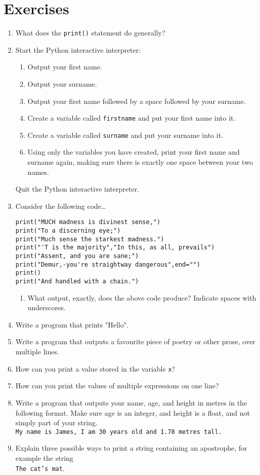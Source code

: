 \section{Exercises}
\begin{enumerate}
	\item What does the \texttt{print()} statement do generally?
	\item Start the Python interactive interpreter:     
\begin{enumerate}
	\item Output your first name.
	\item Output your surname.
	\item Output your first name followed by a space followed by         your surname.
	\item Create a variable called \texttt{firstname} and put your first         name into it.
	\item Create a variable called \texttt{surname} and put your surname         into it.
	\item Using only the variables you have created, print your         first name and surname again, making sure there is exactly         one space between your two names.
\end{enumerate}     Quit the Python interactive interpreter.
    \item Consider the following code\ldots
\begin{lstlisting}
print("MUCH madness is divinest sense,")
print("To a discerning eye;")
print("Much sense the starkest madness.")
print("'T is the majority","In this, as all, prevails")
print("Assent, and you are sane;")
print("Demur,-you're straightway dangerous",end="")
print()
print("And handled with a chain.")\end{lstlisting}
\begin{enumerate}
	\item What output, exactly, does the above code produce? Indicate     spaces with underscores.
\end{enumerate}
\item Write a program that prints "Hello".
\item Write a program that outputs a favourite piece of poetry or other     prose, over multiple lines.
\item How can you print a value stored in the variable \texttt{x}?
\item How can you print the values of multiple expressions on one line?
\item Write a program that outputs your name, age, and height in     metres in the following format. Make sure age is an integer, and     height is a float, and not simply part of your string.
\\
\texttt{My name is James, I am 30 years old and 1.78 metres       tall.}
\item Explain three possible ways to print a string containing an     apostrophe, for example the string
\\
\texttt{The cat's       mat}.
\end{enumerate}   
